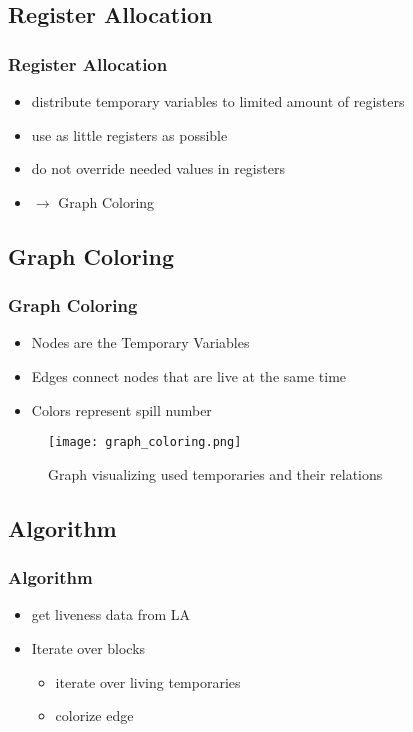 \begin{frame}
  \section*{Register Allocation}
  \frametitle{Register Allocation}
  \begin{itemize}
    \item distribute temporary variables to limited amount of registers
    \item use as little registers as possible
    \item do not override needed values in registers
    \item $\rightarrow$ Graph Coloring
  \end{itemize}
\end{frame}

\begin{frame}
  \section*{Graph Coloring}
  \frametitle{Graph Coloring}
  \begin{itemize}
    \item Nodes are the Temporary Variables
    \item Edges connect nodes that are live at the same time
    \item Colors represent spill number
  \end{itemize}
\end{frame}

\begin{frame}
  \begin{figure}
  \texttt{[image: graph\_coloring.png]}
  \caption{\small Graph visualizing used temporaries and their relations}
  \end{figure}
\end{frame}

\begin{frame}
    \section*{Algorithm}
    \frametitle{Algorithm}
    \begin{itemize}
       \item get liveness data from LA
       \item Iterate over blocks
         \begin{itemize}
           \item iterate over living temporaries
           \item colorize edge
         \end{itemize}
    \end{itemize}
\end{frame}

